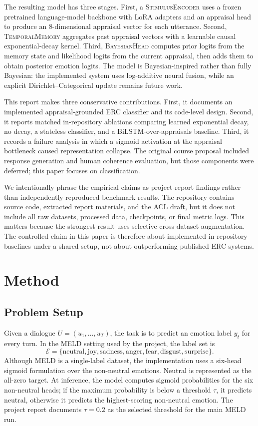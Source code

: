\documentclass[11pt]{article}
\begin{document}
The resulting model has three stages. First, a \textsc{StimulusEncoder} uses a frozen pretrained language-model backbone with LoRA adapters \citep{hu2021lora} and an appraisal head to produce an 8-dimensional appraisal vector for each utterance. Second, \textsc{TemporalMemory} aggregates past appraisal vectors with a learnable causal exponential-decay kernel. Third, \textsc{BayesianHead} computes prior logits from the memory state and likelihood logits from the current appraisal, then adds them to obtain posterior emotion logits. The model is Bayesian-inspired rather than fully Bayesian: the implemented system uses log-additive neural fusion, while an explicit Dirichlet--Categorical update remains future work.

This report makes three conservative contributions. First, it documents an implemented appraisal-grounded ERC classifier and its code-level design. Second, it reports matched in-repository ablations comparing learned exponential decay, no decay, a stateless classifier, and a BiLSTM-over-appraisals baseline. Third, it records a failure analysis in which a sigmoid activation at the appraisal bottleneck caused representation collapse. The original course proposal included response generation and human coherence evaluation, but those components were deferred; this paper focuses on classification.

We intentionally phrase the empirical claims as project-report findings rather than independently reproduced benchmark results. The repository contains source code, extracted report materials, and the ACL draft, but it does not include all raw datasets, processed data, checkpoints, or final metric logs. This matters because the strongest result uses selective cross-dataset augmentation. The controlled claim in this paper is therefore about implemented in-repository baselines under a shared setup, not about outperforming published ERC systems.

\section{Method}

\subsection{Problem Setup}

Given a dialogue $U=(u_1,\ldots,u_T)$, the task is to predict an emotion label $y_t$ for every turn. In the MELD setting used by the project, the label set is
\[
\mathcal{E}=\{\text{neutral},\text{joy},\text{sadness},\text{anger},\text{fear},\text{disgust},\text{surprise}\}.
\]
Although MELD is a single-label dataset, the implementation uses a six-head sigmoid formulation over the non-neutral emotions. Neutral is represented as the all-zero target. At inference, the model computes sigmoid probabilities for the six non-neutral heads; if the maximum probability is below a threshold $\tau$, it predicts neutral, otherwise it predicts the highest-scoring non-neutral emotion. The project report documents $\tau=0.2$ as the selected threshold for the main MELD run.
\end{document}
